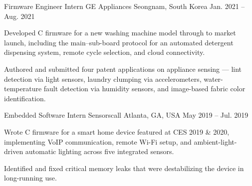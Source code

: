 \begin{cventries}
  \cventry
    {Firmware Engineer Intern} %
    {GE Appliances} %
    {Seongnam, South Korea} %
    {Jan. 2021 -- Aug. 2021} %
    {
      \begin{cvitems}
        \item {Developed C firmware for a new washing machine model through to market launch, including the main--sub-board protocol for an automated detergent dispensing system, remote cycle selection, and cloud connectivity.}
        \item {Authored and submitted four patent applications on appliance sensing — lint detection via light sensors, laundry clumping via accelerometers, water-temperature fault detection via humidity sensors, and image-based fabric color identification.}
      \end{cvitems}
    }

  \cventry
    {Embedded Software Intern} %
    {Sensorscall} %
    {Atlanta, GA, USA} %
    {May 2019 -- Jul. 2019} %
    {
      \begin{cvitems}
        \item {Wrote C firmware for a smart home device featured at CES 2019 \& 2020, implementing VoIP communication, remote Wi-Fi setup, and ambient-light-driven automatic lighting across five integrated sensors.}
        \item {Identified and fixed critical memory leaks that were destabilizing the device in long-running use.}
      \end{cvitems}
    }
\end{cventries}
